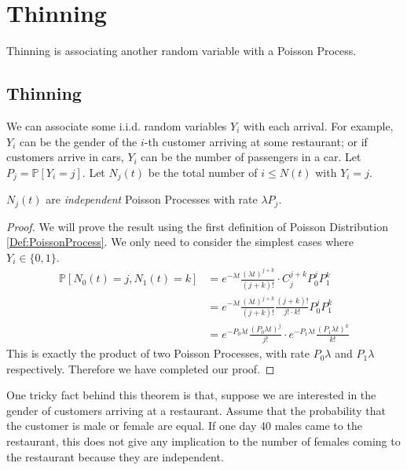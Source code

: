\section{Thinning}
    Thinning is associating another random variable with a Poisson Process.

    \subsection{Thinning}
        We can associate some i.i.d. random variables $Y_i$ with each arrival. For example, $Y_i$ can be the gender of the $i$-th customer arriving at some restaurant; or if customers arrive in cars, $Y_i$ can be the number of passengers in a car. Let $P_j = \mathbb{P}[Y_i = j]$. Let $N_j(t)$ be the total number of $i \le N(t)$ with $Y_i = j$.

        \begin{theorem}\label{Thm:ThinningOfPoissonProcess}
            $N_j(t)$ are \emph{independent} Poisson Processes with rate $\lambda P_j$.
        \end{theorem}
        \begin{proof}
            We will prove the result using the first definition of Poisson Distribution \ref{Def:PoissonProcess}. We only need to consider the simplest cases where $Y_i \in \{0,1\}$.
            \begin{align*}
                \mathbb{P}[N_0(t) = j, N_1(t) = k] &= e^{-\lambda t}\frac{(\lambda t)^{j+k}}{(j+k)!}\cdot C^{j+k}_j P_0^j P_1^k \\
                &= e^{-\lambda t}\frac{(\lambda t)^{j+k}}{(j+k)!}\frac{(j+k)!}{j! \cdot k!}P_0^j P_1^k\\
                &= e^{-P_0\lambda t}\frac{(P_0\lambda t)^j}{j!} \cdot e^{-P_1\lambda t} \frac{(P_1 \lambda t)^k}{k!}
            \end{align*}
            This is exactly the product of two Poisson Processes, with rate $P_0\lambda$ and $P_1\lambda$ respectively. Therefore we have completed our proof.
        \end{proof}
        \begin{remark}
            One tricky fact behind this theorem is that, suppose we are interested in the gender of customers arriving at a restaurant. Assume that the probability that the customer is male or female are equal. If one day 40 males came to the restaurant, this does not give any implication to the number of females coming to the restaurant because they are independent.
        \end{remark}


